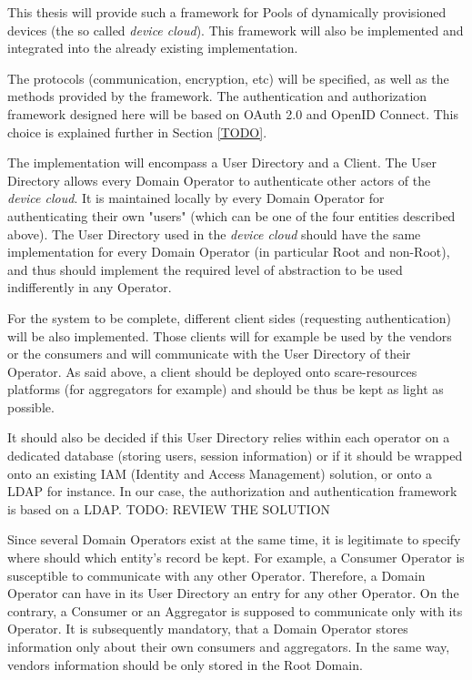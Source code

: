 This thesis will provide such a framework for Pools of dynamically provisioned devices (the so called \emph{device cloud}). This framework will also be implemented and integrated into the already existing implementation.

The protocols (communication, encryption, etc) will be specified, as well as the methods provided by the framework. The authentication and authorization framework designed here will be based on OAuth 2.0 and OpenID Connect. This choice is explained further in Section \ref{TODO}. 

The implementation will encompass a User Directory and a Client. The User Directory allows every Domain Operator to authenticate other actors of the \emph{device cloud}. It is maintained locally by every Domain Operator for authenticating their own "users" (which can be one of the four entities described above). The User Directory used in the \emph{device cloud} should have the same implementation for every Domain Operator (in particular Root and non-Root), and thus should implement the required level of abstraction to be used indifferently in any Operator.

For the system to be complete, different client sides (requesting authentication) will be also implemented. Those clients will for example be used by the vendors or the consumers and will communicate with the User Directory of their Operator. As said above, a client should be deployed onto scare-resources platforms (for aggregators for example) and should be thus be kept as light as possible.

It should also be decided if this User Directory relies within each operator on a dedicated database (storing users, session information) or if it should be wrapped onto an existing IAM (Identity and Access Management) solution, or onto a LDAP for instance. In our case, the authorization and authentication framework is based on a LDAP.
{ \huge TODO: REVIEW THE SOLUTION }

Since several Domain Operators exist at the same time, it is legitimate to specify where should which entity's record be kept. For example, a Consumer Operator is susceptible to communicate with any other Operator. Therefore, a Domain Operator can have in its User Directory an entry for any other Operator. On the contrary, a Consumer or an Aggregator is supposed to communicate only with its Operator. It is subsequently mandatory, that a Domain Operator stores information only about their own consumers and aggregators. In the same way, vendors information should be only stored in the Root Domain.


